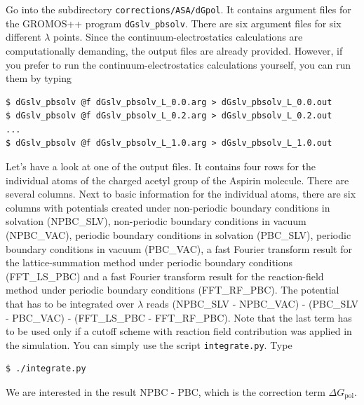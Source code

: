 Go into the subdirectory \texttt{corrections/ASA/dGpol}. It
contains argument files for the GROMOS++ program
\texttt{dGslv\_pbsolv}. There are six argument files for six different
$\lambda$ points.
Since the continuum-electrostatics calculations are
computationally demanding, the output files are already
provided. However, if you prefer to run the continuum-electrostatics
calculations yourself, you can run them by typing
\begin{lstlisting}
$ dGslv_pbsolv @f dGslv_pbsolv_L_0.0.arg > dGslv_pbsolv_L_0.0.out
$ dGslv_pbsolv @f dGslv_pbsolv_L_0.2.arg > dGslv_pbsolv_L_0.2.out
...
$ dGslv_pbsolv @f dGslv_pbsolv_L_1.0.arg > dGslv_pbsolv_L_1.0.out
\end{lstlisting}
%
Let's have a look at one of the output files. It contains four rows for
the individual atoms of the charged acetyl group
of the Aspirin molecule. There are several
columns. Next to basic information for the individual atoms, there are
six columns with potentials created under non-periodic boundary
conditions in solvation (NPBC\_SLV), non-periodic boundary conditions
in vacuum (NPBC\_VAC), periodic boundary conditions in solvation
(PBC\_SLV), periodic boundary conditions in vacuum (PBC\_VAC), a fast
Fourier transform result for the lattice-summation method under
periodic boundary conditions (FFT\_LS\_PBC) and a fast Fourier
transform result for the reaction-field method under periodic boundary
conditions (FFT\_RF\_PBC).  The potential that has to be integrated
over $\lambda$ reads (NPBC\_SLV - NPBC\_VAC) - (PBC\_SLV - PBC\_VAC) -
(FFT\_LS\_PBC - FFT\_RF\_PBC). Note that the last term has to be used
only if a cutoff scheme with reaction field contribution was applied
in the simulation. You can simply use the script
\texttt{integrate.py}. Type
\begin{lstlisting}
$ ./integrate.py
\end{lstlisting}
We are interested in the result NPBC - PBC, which is the correction term $\Delta G_{\text{pol}}$.


